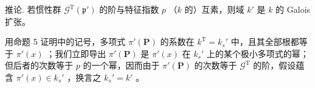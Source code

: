 推论. 若惯性群 \(\mathcal{G}^{\mathrm{T}}(\mathfrak{p}')\) 的阶与特征指数 \(p\) （\(k\) 的）互素，则域 \(k'\) 是 \(k\) 的 Galois 扩张。

用命题 5 证明中的记号，多项式 \(\pi'(\mathbf{P})\) 的系数在 \(k^{\mathrm{T}} = k_{s}'\) 中，且其全部根都等于 \(\pi'(x)\) ；我们立即导出 \(\pi'(\mathbf{P})\) 是 \(\pi'(x)\) 在 \(k_{s}'\) 上的某个极小多项式的幂；但后者的次数等于 \(p\) 的一个幂，因而由于 \(\pi'(\mathbf{P})\) 的次数等于 \(\mathcal{G}^{\mathrm{T}}\) 的阶，假设蕴含 \(\pi'(x) \in k_{s}'\) ，换言之 \(k_{s}' = k'\) 。
\relax{}
